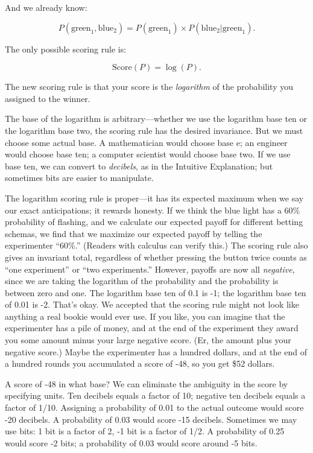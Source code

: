 {
 And we already know:}

\begin{equation*}
 P(\text{green}_{1},\text{blue}_{2}) = P(\text{green}_{1}) \times P(\text{blue}_{2}|\text{green}_{1}).
\end{equation*}

{
 The only possible scoring rule is:}

\begin{equation*}
 \text{Score}(P) = \log(P).
\end{equation*}

{
 The new scoring rule is that your score is the \textit{logarithm}
of the probability you assigned to the winner.}

{
 The base of the logarithm is arbitrary---whether we use the
logarithm base ten or the logarithm base two, the scoring rule has the
desired invariance. But we must choose some actual base. A
mathematician would choose base e; an engineer would choose base ten; a
computer scientist would choose base two. If we use base ten, we can
convert to \textit{decibels}, as in the Intuitive Explanation; but
sometimes bits are easier to manipulate.}

{
 The logarithm scoring rule is proper---it has its expected maximum
when we say our exact anticipations; it rewards honesty. If we think
the blue light has a 60\% probability of flashing, and we calculate our
expected payoff for different betting schemas, we find that we maximize
our expected payoff by telling the experimenter
``60\%.'' (Readers with calculus can
verify this.) The scoring rule also gives an invariant total,
regardless of whether pressing the button twice counts as
``one experiment'' or
``two experiments.'' However,
payoffs are now all \textit{negative}, since we are taking the
logarithm of the probability and the probability is between zero and
one. The logarithm base ten of 0.1 is -1; the logarithm base ten of
0.01 is -2. That's okay. We accepted that the scoring
rule might not look like anything a real bookie would ever use. If you
like, you can imagine that the experimenter has a pile of money, and at
the end of the experiment they award you some amount minus your large
negative score. (Er, the amount plus your negative score.) Maybe the
experimenter has a hundred dollars, and at the end of a hundred rounds
you accumulated a score of -48, so you get \$52 dollars.}

{
 A score of -48 in what base? We can eliminate the ambiguity in the
score by specifying units. Ten decibels equals a factor of 10; negative
ten decibels equals a factor of 1/10. Assigning a probability of 0.01
to the actual outcome would score -20 decibels. A probability of 0.03
would score -15 decibels. Sometimes we may use bits: 1 bit is a factor
of 2, -1 bit is a factor of 1/2. A probability of 0.25 would score -2
bits; a probability of 0.03 would score around -5 bits.}

